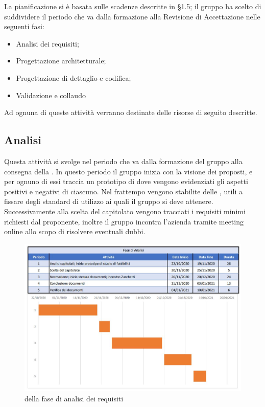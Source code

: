 \documentclass[../piano_di_progetto.tex]{subfiles}
\begin{document}
La pianificazione si è basata sulle scadenze descritte in \S1.5; il gruppo ha scelto di suddividere il periodo che va dalla formazione alla Revisione di Accettazione nelle seguenti fasi:
\begin{itemize}
\item Analisi dei requisiti;
\item Progettazione architetturale;
\item Progettazione di dettaglio e codifica;
\item Validazione e collaudo
\end{itemize}
Ad ognuna di queste attività verranno destinate delle risorse di seguito descritte.


\subsection{Analisi}%
\label{sub:analisi}
Questa attività si svolge nel periodo che va dalla formazione del gruppo alla consegna della . In questo periodo il gruppo inizia con la visione dei  proposti, e per ognuno di essi traccia un prototipo di  dove vengono evidenziati gli aspetti positivi e negativi di ciascuno. Nel frattempo vengono stabilite delle , utili a fissare degli standard di utilizzo ai quali il gruppo si deve attenere. Successivamente alla scelta del capitolato vengono tracciati i requisiti minimi richiesti dal proponente, inoltre il gruppo incontra l’azienda tramite meeting online allo scopo di risolvere eventuali dubbi.\\

\begin{figure}[H]
\centering
\includegraphics[width=12cm]{img/fase_analisi}
\caption{  della fase di analisi dei requisiti}
\end{figure}
\end{document}
